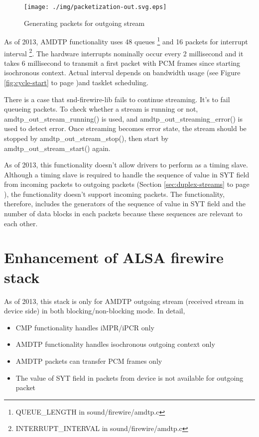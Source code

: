 \documentclass[onecolumn]{article}
\begin{document}
\begin{figure}[H]
	\centering
	\texttt{[image: ./img/packetization-out.svg.eps]}
	\caption{{Generating packets for outgoing stream}}
	\label{fig:packetization-out}
\end{figure}

As of 2013, AMDTP functionality uses 48 queues \footnote{QUEUE\_LENGTH in sound/firewire/amdtp.c} and 16 packets for interrupt interval \footnote{INTERRUPT\_INTERVAL in sound/firewire/amdtp.c}. The hardware interrupts nominally occur every 2 millisecond and it takes 6 millisecond to transmit a first packet with PCM frames since starting isochronous context. Actual interval depends on bandwidth usage (see Figure \ref{fig:cycle-start} to page \pageref{fig:cycle-start})and tasklet scheduling.

There is a case that snd-firewire-lib fails to continue streaming. It's to fail queueing packets. To check whether a stream is running or not, amdtp\_out\_stream\_running() is used, and amdtp\_out\_streaming\_error() is used to detect error. Once streaming becomes error state, the stream should be stopped by amdtp\_out\_stream\_stop(), then start by amdtp\_out\_stream\_start() again.

As of 2013, this functionality doesn't allow drivers to perform as a timing slave. Although a timing slave is required to handle the sequence of value in SYT field from incoming packets to outgoing packets (Section \ref{sec:duplex-streams} to page \pageref{sec:duplex-streams}), the functionality doesn't support incoming packets. The functionality, therefore, includes the generators of the sequence of value in SYT field and the number of data blocks in each packets because these sequences are relevant to each other.

\section{Enhancement of ALSA firewire stack}

As of 2013, this stack is only for AMDTP outgoing stream (received stream in device side) in both blocking/non-blocking mode. In detail,
\begin{itemize}
\item CMP functionality handles iMPR/iPCR only
\item AMDTP functionality handles isochronous outgoing context only
\item AMDTP packets can transfer PCM frames only
\item The value of SYT field in packets from device is not available for outgoing packet
\end{itemize}
\end{document}
